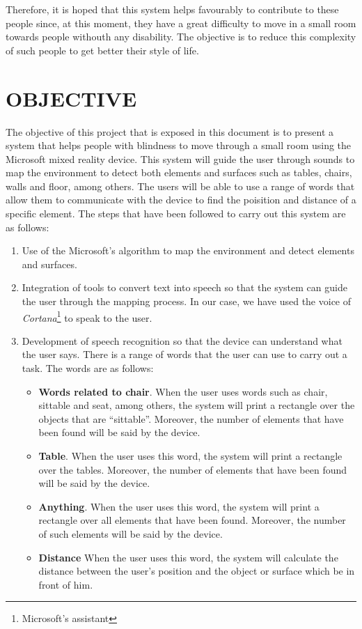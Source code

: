 \documentclass{pre-tfg}
\begin{document}
Therefore, it is hoped that this system helps favourably to contribute to these people since, at this moment, they have a great difficulty to 
move in a small room towards people withouth any disability. The objective is to reduce this complexity of such people to get better their style of life.

\section{OBJECTIVE}
The objective of this project that is exposed in this document is to present a system that helps people with blindness to move through a
small room using the Microsoft mixed reality device. This system will guide the user through sounds to map the environment to detect both elements and surfaces such as tables, chairs, walls and floor, among others. The users will be able to use a range of words that allow them
to communicate with the device to find the poisition and distance of a specific element. The steps that have been followed to carry
out this system are as follows:

\begin{enumerate}
\item Use of the Microsoft's algorithm to map the environment and detect elements and surfaces.
\item Integration of tools to convert text into speech so that the system can guide the user through the mapping process. In our case,
we have used the voice of \textit{Cortana}\footnote{Microsoft's assistant} to speak to the user.
\item Development of speech recognition so that the device can understand what the user says. There is a range of words that
the user can use to carry out a task. The words are as follows:
\begin{itemize}
\item \textbf{Words related to chair}. When the user uses words such as chair, sittable and seat, among others, the system will print a 
rectangle over the objects that are ``sittable''. Moreover, the number of elements that have been found will be said by the device.
\item \textbf{Table}. When the user uses this word, the system will print a rectangle over the tables. Moreover, the number of elements
that have been found will be said by the device.
\item \textbf{Anything}. When the user uses this word, the system will print a rectangle over all elements that have been found. Moreover, the number of such elements will be said by the device.
\item \textbf{Distance} When the user uses this word, the system will calculate the distance between the user's position and
the object or surface which be in front of him.
\end{itemize}

\end{enumerate}

%
%
\end{document}
